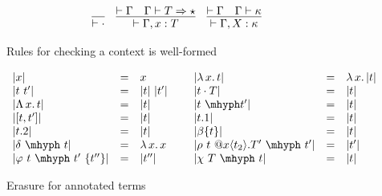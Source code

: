 \documentclass{article}
\newcommand{\absu}[3]{{#1}\, #2.\, #3}
\newcommand{\tpsynth}[0]{\Rightarrow}
\begin{document}
\begin{figure}
  \centering
  \[
    \begin{array}{lll}
      \infer{\vdash \cdot}{}
      & \infer{
        \vdash \Gamma,x:T
        }{\vdash \Gamma
          \quad \Gamma \vdash T \tpsynth \star}
      & \infer{
        \vdash \Gamma,X:\kappa
        }{
        \vdash \Gamma
        \quad \Gamma \vdash \kappa
        }
    \end{array}
  \]
  \caption{Rules for checking a context is well-formed}
  \label{fig:ctxt}
\end{figure}


\begin{figure}
  \[
  \begin{array}{lllllll}
    |x| & = & x &\ &
    |\absu{\lambda}{x}{t}| & = & \absu{\lambda}{x}{|t|} \\
    |t\ t'| & = & |t|\ |t'| &\ &
    |t\cdot T| & = & |t| \\
    |\absu{\Lambda}{x}{t}| & = & |t| &\ &
    |t\ \mhyph t'| & = & |t| \\
    |[t , t']| & = & |t| &\ &
    |t.1| & = & |t| \\
    |t.2| & = & |t| &\ &
    |\beta\{t\}| & = & |t|\\
    |\delta\ \mhyph\ t| & = & \absu{\lambda}{x}{x}&\ &
    |\rho\ t\ @x\langle t_2 \rangle.T'\ \mhyph\ t'| & = & |t'| \\
    |\varphi\ t\ \mhyph\ t'\ \{t''\}| & = & |t''| &\ &
    |\chi\ T\ \mhyph\ t| & = & |t|
  \end{array}
  \]
  \caption{Erasure for annotated terms}
  \label{fig:eraser}
\end{figure}  
\end{document}

